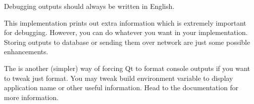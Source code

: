 \begin{fdocextra}
Debugging outputs should always be written in English.
\end{fdocextra}

This implementation prints out extra information which is extremely important for debugging. However, you can do whatever you want in your implementation. Storing outputs to database or sending them over network are just some possible enhancements.

The is another (simpler) way of forcing Qt to format console outputs if you want to tweak just format. You may tweak build environment variable to display application name or other useful information. Head to the documentation \citep{various:qtdoc} for more information.
%
